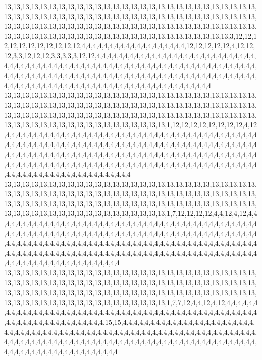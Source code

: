 13,13,13,13,13,13,13,13,13,13,13,13,13,13,13,13,13,13,13,13,13,13,13,13,13,13,13,13,13,13,13,13,13,13,13,13,13,13,13,13,13,13,13,13,13,13,13,13,13,13,13,13,13,13,13,13,13,13,13,13,13,13,13,13,13,13,13,13,13,13,13,13,13,13,13,13,13,13,13,13,13,13,13,13,13,13,13,13,13,13,13,13,13,13,13,13,13,13,13,13,13,13,13,13,13,13,13,13,13,3,12,12,12,12,12,12,12,12,12,12,12,4,4,4,4,4,4,4,4,4,4,4,4,4,4,4,4,4,4,4,12,12,12,12,12,4,12,12,12,3,3,12,12,12,3,3,3,3,3,12,12,4,4,4,4,4,4,4,4,4,4,4,4,4,4,4,4,4,4,4,4,4,4,4,4,4,4,4,4,4,4,4,4,4,4,4,4,4,4,4,4,4,4,4,4,4,4,4,4,4,4,4,4,4,4,4,4,4,4,4,4,4,4,4,4,4,4,4,4,4,4,4,4,4,4,4,4,4,4,4,4,4,4,4,4,4,4,4,4,4,4,4,4,4,4,4,4,4,4,4,4,4,4,4,4,4,4,4,4,4,4,4,4,4,4,4,4,4,4,4,4,4,4,4,4,4,4,4,4,4,4,4,4,4,4,4,4,4,4,4,4,4,4,4,4,4,4,4,4,4,4,4,4,4,4,4,4,4,4,4
13,13,13,13,13,13,13,13,13,13,13,13,13,13,13,13,13,13,13,13,13,13,13,13,13,13,13,13,13,13,13,13,13,13,13,13,13,13,13,13,13,13,13,13,13,13,13,13,13,13,13,13,13,13,13,13,13,13,13,13,13,13,13,13,13,13,13,13,13,13,13,13,13,13,13,13,13,13,13,13,13,13,13,13,13,13,13,13,13,13,13,13,13,13,13,13,13,13,13,13,13,13,1,12,12,12,12,12,12,12,12,4,12,4,4,4,4,4,4,4,4,4,4,4,4,4,4,4,4,4,4,4,4,4,4,4,4,4,4,4,4,4,4,4,4,4,4,4,4,4,4,4,4,4,4,4,4,4,4,4,4,4,4,4,4,4,4,4,4,4,4,4,4,4,4,4,4,4,4,4,4,4,4,4,4,4,4,4,4,4,4,4,4,4,4,4,4,4,4,4,4,4,4,4,4,4,4,4,4,4,4,4,4,4,4,4,4,4,4,4,4,4,4,4,4,4,4,4,4,4,4,4,4,4,4,4,4,4,4,4,4,4,4,4,4,4,4,4,4,4,4,4,4,4,4,4,4,4,4,4,4,4,4,4,4,4,4,4,4,4,4,4,4,4,4,4,4,4,4,4,4,4,4,4,4,4,4,4,4,4,4,4,4,4,4,4,4,4,4,4,4,4,4,4,4,4,4,4,4,4,4,4,4,4,4,4,4,4,4,4
13,13,13,13,13,13,13,13,13,13,13,13,13,13,13,13,13,13,13,13,13,13,13,13,13,13,13,13,13,13,13,13,13,13,13,13,13,13,13,13,13,13,13,13,13,13,13,13,13,13,13,13,13,13,13,13,13,13,13,13,13,13,13,13,13,13,13,13,13,13,13,13,13,13,13,13,13,13,13,13,13,13,13,13,13,13,13,13,13,13,13,13,13,13,13,13,13,13,13,13,13,13,1,7,12,12,12,12,4,4,12,4,12,4,4,4,4,4,4,4,4,4,4,4,4,4,4,4,4,4,4,4,4,4,4,4,4,4,4,4,4,4,4,4,4,4,4,4,4,4,4,4,4,4,4,4,4,4,4,4,4,4,4,4,4,4,4,4,4,4,4,4,4,4,4,4,4,4,4,4,4,4,4,4,4,4,4,4,4,4,4,4,4,4,4,4,4,4,4,4,4,4,4,4,4,4,4,4,4,4,4,4,4,4,4,4,4,4,4,4,4,4,4,4,4,4,4,4,4,4,4,4,4,4,4,4,4,4,4,4,4,4,4,4,4,4,4,4,4,4,4,4,4,4,4,4,4,4,4,4,4,4,4,4,4,4,4,4,4,4,4,4,4,4,4,4,4,4,4,4,4,4,4,4,4,4,4,4,4,4,4,4,4,4,4,4,4,4,4,4,4,4,4,4,4,4,4,4,4,4,4,4,4,4,4,4,4,4,4,4
13,13,13,13,13,13,13,13,13,13,13,13,13,13,13,13,13,13,13,13,13,13,13,13,13,13,13,13,13,13,13,13,13,13,13,13,13,13,13,13,13,13,13,13,13,13,13,13,13,13,13,13,13,13,13,13,13,13,13,13,13,13,13,13,13,13,13,13,13,13,13,13,13,13,13,13,13,13,13,13,13,13,13,13,13,13,13,13,13,13,13,13,13,13,13,13,13,13,13,13,13,13,1,7,7,12,4,4,12,4,12,4,4,4,4,4,4,4,4,4,4,4,4,4,4,4,4,4,4,4,4,4,4,4,4,4,4,4,4,4,4,4,4,4,4,4,4,4,4,4,4,4,4,4,4,4,4,4,4,4,4,4,4,4,4,4,4,4,4,4,4,4,4,4,4,4,4,4,4,4,4,15,15,4,4,4,4,4,4,4,4,4,4,4,4,4,4,4,4,4,4,4,4,4,4,4,4,4,4,4,4,4,4,4,4,4,4,4,4,4,4,4,4,4,4,4,4,4,4,4,4,4,4,4,4,4,4,4,4,4,4,4,4,4,4,4,4,4,4,4,4,4,4,4,4,4,4,4,4,4,4,4,4,4,4,4,4,4,4,4,4,4,4,4,4,4,4,4,4,4,4,4,4,4,4,4,4,4,4,4,4,4,4,4,4,4,4,4,4,4,4,4,4,4,4,4,4,4,4,4,4,4,4,4,4,4,4,4,4,4
